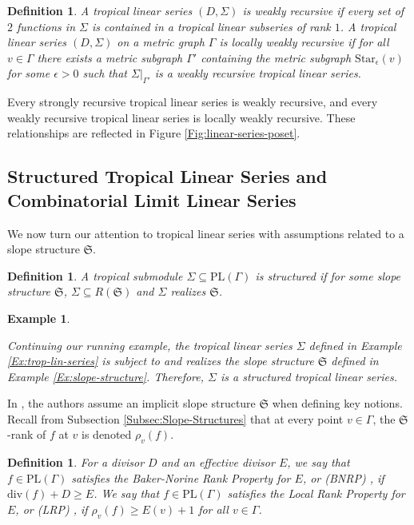 \documentclass{amsart}
\makeatletter
\newtheorem{definition}[theorem]{Definition}
\newtheorem{varexample}[theorem]{Example}
\def\namedlabel#1#2{\begingroup
	#2%
	\def\@currentlabel{#2}%
	\phantomsection\label{#1}\endgroup
}
\newenvironment{example}{\begin{varexample}
		\begin{normalfont}}{\end{normalfont}
\end{varexample}}
\makeatother
\begin{document}
	\begin{definition}
		\label{Def:LWRTLS}
		A tropical linear series $(D,\Sigma)$ is weakly recursive if every set of $2$ functions in $\Sigma$ is contained in a tropical linear subseries of rank $1$. A tropical linear series $(D,\Sigma)$ on a metric graph $\Gamma$ is locally weakly recursive if for all $v \in \Gamma$ there exists a metric subgraph $\Gamma'$ containing the metric subgraph $\mathrm{Star}_{\epsilon}(v)$ for some $\epsilon > 0$ such that $\Sigma|_{\Gamma'}$ is a weakly recursive tropical linear series.
	\end{definition}
	
	Every strongly recursive tropical linear series is weakly recursive, and every weakly recursive tropical linear series is locally weakly recursive. These relationships are reflected in Figure \ref{Fig:linear-series-poset}.
	
	\subsection{Structured Tropical Linear Series and Combinatorial Limit Linear Series}
	\label{Subsec:CLLS}
	
	We now turn our attention to tropical linear series with assumptions related to a slope structure $\mathfrak{S}$.
	
	\begin{definition}
		\label{Def:Structured}
		A tropical submodule $\Sigma \subseteq \mathrm{PL}(\Gamma)$ is \textit{structured} if for some slope structure $\mathfrak{S}$, $\Sigma \subseteq R(\mathfrak{S})$ and $\Sigma$ realizes $\mathfrak{S}$.
	\end{definition}
	
	\begin{example}
		\label{Ex:structured-tls}
		Continuing our running example, the tropical linear series $\Sigma$ defined in Example \ref{Ex:trop-lin-series} is subject to and realizes the slope structure $\mathfrak{S}$ defined in Example \ref{Ex:slope-structure}. Therefore, $\Sigma$ is a structured tropical linear series.
	\end{example}
	
	In \cite{amini2022limit}, the authors assume an implicit slope structure $\mathfrak{S}$ when defining key notions. Recall from Subsection \ref{Subsec:Slope-Structures} that at every point $v \in \Gamma$, the $\mathfrak{S}$-rank of $f$ at $v$ is denoted $\rho_{v}(f)$.
	
	\begin{definition}
		For a divisor $D$ and an effective divisor $E$, we say that $f \in \mathrm{PL}(\Gamma)$ satisfies the Baker-Norine Rank Property for $E$, or \namedlabel{prop:BNRP}{(BNRP)}, if $\mathrm{div}(f) + D \geq E$. We say that $f \in \mathrm{PL}(\Gamma)$ satisfies the Local Rank Property for $E$, or \namedlabel{prop:LRP}{(LRP)}, if $\rho_v(f) \geq E(v) + 1$ for all $v \in \Gamma$.
	\end{definition}
	
\end{document}

